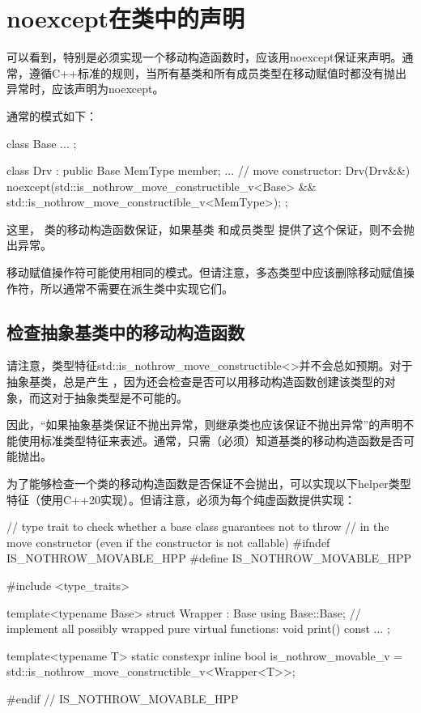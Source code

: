 \section{noexcept在类中的声明}
可以看到，特别是必须实现一个移动构造函数时，应该用noexcept保证来声明。通常，遵循C++标准的规则，当所有基类和所有成员类型在移动赋值时都没有抛出异常时，应该声明为noexcept。

通常的模式如下：

\begin{cppcode}
class Base {
	...
};

class Drv : public Base {
	MemType member;
	...
	// move constructor:
	Drv(Drv&&) noexcept(std::is_nothrow_move_constructible_v<Base> &&
	std::is_nothrow_move_constructible_v<MemType>);
};
\end{cppcode}

这里， 类的移动构造函数保证，如果基类  和成员类型  提供了这个保证，则不会抛出异常。

移动赋值操作符可能使用相同的模式。但请注意，多态类型中应该删除移动赋值操作符，所以通常不需要在派生类中实现它们。

\subsection{检查抽象基类中的移动构造函数}

请注意，类型特征std::is_nothrow_move_constructible<>并不会总如预期。对于抽象基类，总是产生 ，因为还会检查是否可以用移动构造函数创建该类型的对象，而这对于抽象类型是不可能的。

因此，“如果抽象基类保证不抛出异常，则继承类也应该保证不抛出异常”的声明不能使用标准类型特征来表述。通常，只需（必须）知道基类的移动构造函数是否可能抛出。

为了能够检查一个类的移动构造函数是否保证不会抛出，可以实现以下helper类型特征（使用C++20实现）。但请注意，必须为每个纯虚函数提供实现：

\begin{cppcode}
// type trait to check whether a base class guarantees not to throw
// in the move constructor (even if the constructor is not callable)
#ifndef IS_NOTHROW_MOVABLE_HPP
#define IS_NOTHROW_MOVABLE_HPP

#include <type_traits>

template<typename Base>
struct Wrapper : Base {
	using Base::Base;
	// implement all possibly wrapped pure virtual functions:
	void print() const {}
	...
};

template<typename T>
static constexpr inline bool is_nothrow_movable_v
	= std::is_nothrow_move_constructible_v<Wrapper<T>>;

#endif // IS_NOTHROW_MOVABLE_HPP
\end{cppcode}

